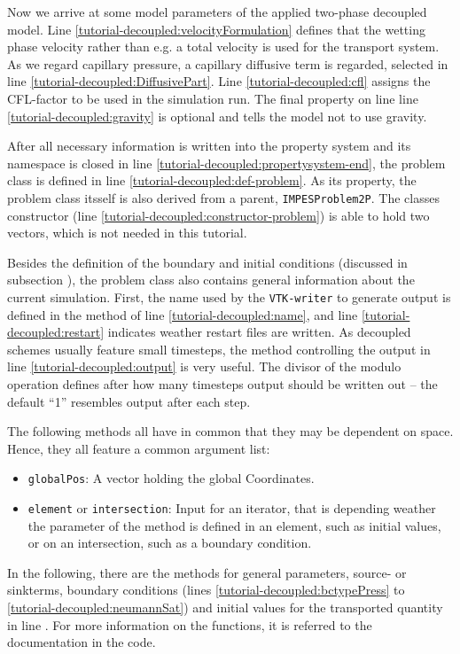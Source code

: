 Now we arrive at some model parameters of the applied two-phase decoupled 
model. Line \ref{tutorial-decoupled:velocityFormulation} defines that the 
wetting phase velocity rather than e.g. a total velocity is used for the 
transport system. As we regard capillary pressure, a capillary diffusive 
term is regarded, selected in line \ref{tutorial-decoupled:DiffusivePart}.
Line \ref{tutorial-decoupled:cfl} assigns the CFL-factor to be used in the
simulation run. The final property on line line \ref{tutorial-decoupled:gravity} 
is optional and tells the model not to use gravity.

After all necessary information is written into the property system and 
its namespace is closed in line \ref{tutorial-decoupled:propertysystem-end},
the problem class is defined in line \ref{tutorial-decoupled:def-problem}. 
As its property, the problem class itsself is also derived from a parent, 
\texttt{IMPESProblem2P}. The classes constructor (line 
\ref{tutorial-decoupled:constructor-problem}) is able to hold two vectors,
which is not needed in this tutorial.

Besides the definition of the boundary and initial conditions (discussed in 
subsection \label{decoupled-problem:boundary}), the problem class also contains
general information about the current simulation. First, the name used by
the \texttt{VTK-writer} to generate output is defined in the method of line
\ref{tutorial-decoupled:name}, and line \ref{tutorial-decoupled:restart} indicates
weather restart files are written. As decoupled schemes usually feature small 
timesteps, the method controlling the output in line \ref{tutorial-decoupled:output}
is very useful. The divisor of the modulo operation defines after how many timesteps
output should be written out -- the default ``1'' resembles output after each 
step.

The following methods all have in common that they may be dependent on space.
Hence, they all feature a common argument list:
\begin{itemize}
 \item \texttt{globalPos}: A vector holding the global Coordinates.
 \item \texttt{element} or \texttt{intersection}: Input for an iterator, that is 
    depending weather the parameter of the method is defined in an element, such as 
    initial values, or on an intersection, such as a boundary condition.
\end{itemize}
In the following, there are the methods for general parameters, source- or
sinkterms, boundary conditions (lines \ref{tutorial-decoupled:bctypePress} to
\ref{tutorial-decoupled:neumannSat}) and initial values for the transported
quantity in line \label{tutorial-decoupled:initSat}. For more information
on the functions, it is referred to the documentation in the code.

